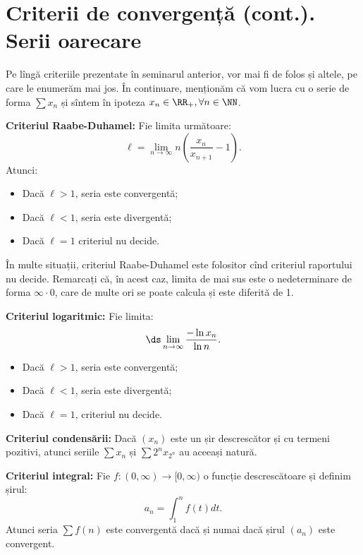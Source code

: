 
\chapter{Criterii de convergență (cont.). Serii oarecare}

Pe lîngă criteriile prezentate în seminarul anterior, vor mai fi de folos
și altele, pe care le enumerăm mai jos. În continuare, menționăm că
vom lucra cu o serie de forma $ \sum x_n $ și sîntem în ipoteza
$ x_n \in \RR_+, \forall n \in \NN $.

\textbf{Criteriul Raabe-Duhamel:} Fie limita următoare:
\[
    \ell = \lim_{n \to \infty} n \left( \dfrac{x_n}{x_{n+1}} - 1 \right).
\]
Atunci:
\begin{itemize}
    \item Dacă $ \ell > 1 $, seria este convergentă;
    \item Dacă $ \ell < 1 $, seria este divergentă;
    \item Dacă $ \ell = 1 $ criteriul nu decide.
\end{itemize}

În multe situații, criteriul Raabe-Duhamel este folositor cînd criteriul
raportului nu decide. Remarcați că, în acest caz, limita de mai sus
este o nedeterminare de forma $ \infty \cdot 0 $, care de multe ori
se poate calcula și este diferită de 1.

\vspace{1cm}

\textbf{Criteriul logaritmic:} Fie limita:
\[
    \ds\lim_{n \to \infty} \dfrac{- \ln x_n}{\ln n}.
\]
\begin{itemize}
    \item Dacă $ \ell > 1 $, seria este convergentă;
    \item Dacă $ \ell < 1 $, seria este divergentă;
    \item Dacă $ \ell = 1 $, criteriul nu decide.
\end{itemize}

\vspace{1cm}

\textbf{Criteriul condensării:} Dacă $ (x_n) $ este un șir
descrescător și cu termeni pozitivi, atunci seriile $ \sum x_n $ și
$ \sum 2^n x_{2^n} $ au aceeași natură.

\vspace{1cm}

\textbf{Criteriul integral:} Fie $ f : (0, \infty) \to [0, \infty) $ o funcție
descrescătoare și definim șirul:
\[
    a_n = \int_1^n f(t) dt.
\]
Atunci seria $ \sum f(n) $ este convergentă dacă și numai dacă șirul $ (a_n) $ este
convergent.

